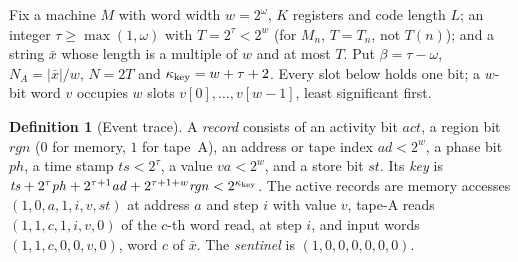 \documentclass[11pt,letterpaper]{article}
\theoremstyle{definition}
\newtheorem{definition}[theorem]{Definition}
\theoremstyle{remark}
\newcommand{\abs}[1]{\left|#1\right|}
\begin{document}
Fix a machine \(M\) with word width \(w=2^\omega\), \(K\) registers and
code length \(L\); an integer \(\tau\ge\max(1,\omega)\) with
\(T=2^\tau<2^w\) (for \(M_n\), \(T=T_n\), not \(T(n)\)); and a string \(\bar x\) whose length is a multiple of
\(w\) and at most \(T\). Put \(\beta=\tau-\omega\),
\(N_A=\abs{\bar x}/w\), \(N=2T\) and \(\kappa_{\rm key}=w+\tau+2\). Every slot
below holds one bit; a \(w\)-bit word \(v\) occupies \(w\) slots
\(v[0],\ldots,v[w-1]\), least significant first.

\begin{definition}[Event trace]\label{def:event-trace}
A \emph{record} consists of an activity bit \(\mathit{act}\), a region
bit \(\mathit{rgn}\) (\(0\) for memory, \(1\) for tape~A), an address or
tape index \(\mathit{ad}<2^w\), a phase bit \(\mathit{ph}\), a time stamp
\(\mathit{ts}<2^\tau\), a value \(\mathit{va}<2^w\), and a store bit
\(\mathit{st}\). Its \emph{key} is
\(\mathit{ts}+2^\tau\mathit{ph}+2^{\tau+1}\mathit{ad}
+2^{\tau+1+w}\mathit{rgn}<2^{\kappa_{\rm key}}\). The active records are memory
accesses \((1,0,a,1,i,v,\mathit{st})\) at address \(a\) and step \(i\)
with value \(v\), tape-A reads \((1,1,c,1,i,v,0)\) of the \(c\)-th word
read, at step \(i\), and input words \((1,1,c,0,0,v,0)\), word \(c\) of
\(\bar x\). The \emph{sentinel} is \((1,0,0,0,0,0,0)\).


\end{definition}
\end{document}
